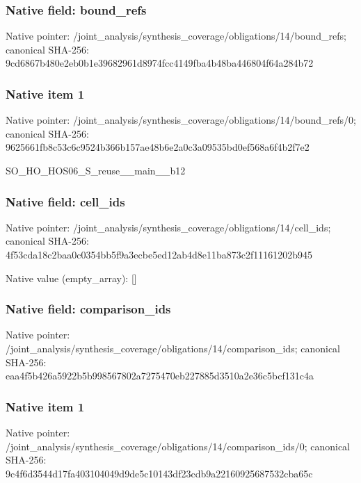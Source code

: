 \documentclass[10pt,a4paper]{article}
\begin{document}
\subsubsection{Native field: bound\_\allowbreak{}refs}
Native pointer: /joint\_\allowbreak{}analysis/synthesis\_\allowbreak{}coverage/obligations/14/bound\_\allowbreak{}refs; canonical SHA-256: 9cd6867b480e2eb0b1e39682961d8974fcc4149fba4b48ba446804f64a284b72

\subsubsection{Native item 1}
Native pointer: /joint\_\allowbreak{}analysis/synthesis\_\allowbreak{}coverage/obligations/14/bound\_\allowbreak{}refs/0; canonical SHA-256: 9625661fb8c53c6c9524b366b157ae48b6e2a0c3a09535bd0ef568a6f4b2f7e2

\begingroup\raggedright\sloppy SO\_\allowbreak{}HO\_\allowbreak{}HOS06\_\allowbreak{}S\_\allowbreak{}reuse\_\allowbreak{}\_\allowbreak{}main\_\allowbreak{}\_\allowbreak{}b12\par\endgroup

\subsubsection{Native field: cell\_\allowbreak{}ids}
Native pointer: /joint\_\allowbreak{}analysis/synthesis\_\allowbreak{}coverage/obligations/14/cell\_\allowbreak{}ids; canonical SHA-256: 4f53cda18c2baa0c0354bb5f9a3ecbe5ed12ab4d8e11ba873c2f11161202b945

Native value (empty\_\allowbreak{}array): []

\subsubsection{Native field: comparison\_\allowbreak{}ids}
Native pointer: /joint\_\allowbreak{}analysis/synthesis\_\allowbreak{}coverage/obligations/14/comparison\_\allowbreak{}ids; canonical SHA-256: eaa4f5b426a5922b5b998567802a7275470eb227885d3510a2e36c5bcf131c4a

\subsubsection{Native item 1}
Native pointer: /joint\_\allowbreak{}analysis/synthesis\_\allowbreak{}coverage/obligations/14/comparison\_\allowbreak{}ids/0; canonical SHA-256: 9c4f6d3544d17fa403104049d9de5c10143df23cdb9a22160925687532cba65c
\end{document}
